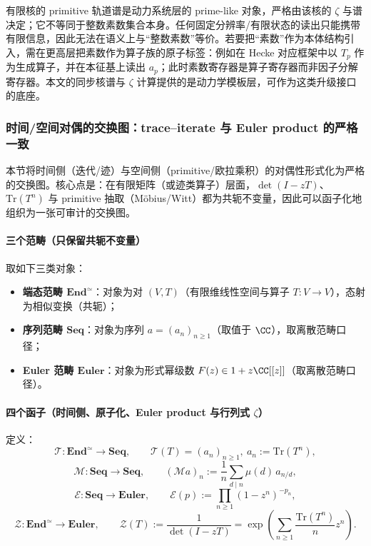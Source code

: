 \begin{remark}[素数影子与算术素数的层级差异]\label{rem:prime-shadow-vs-primes}
有限核的 primitive 轨道谱是动力系统层的 prime-like 对象，严格由该核的 $\zeta$ 与谱决定；它不等同于整数素数集合本身。任何固定分辨率/有限状态的读出只能携带有限信息，因此无法在语义上与“整数素数”等价。若要把“素数”作为本体结构引入，需在更高层把素数作为算子族的原子标签：例如在 Hecke 对应框架中以 $T_p$ 作为生成算子，并在本征基上读出 $a_p$；此时素数寄存器是算子寄存器而非因子分解寄存器。本文的同步核谱与 $\zeta$ 计算提供的是动力学模板层，可作为这类升级接口的底座。
\end{remark}

\subsubsection{时间/空间对偶的交换图：trace--iterate 与 Euler product 的严格一致}\label{subsec:time-space-commuting-diagram}
本节将时间侧（迭代/迹）与空间侧（primitive/欧拉乘积）的对偶性形式化为严格的交换图。核心点是：在有限矩阵（或迹类算子）层面，$\det(I-zT)$、$\mathrm{Tr}(T^n)$ 与 primitive 抽取（Möbius/Witt）都为共轭不变量，因此可以函子化地组织为一张可审计的交换图。

\paragraph{三个范畴（只保留共轭不变量）}
取如下三类对象：
\begin{itemize}
  \item \textbf{端态范畴 $\mathbf{End}^{\simeq}$}：对象为对 $(V,T)$（有限维线性空间与算子 $T:V\to V$），态射为相似变换（共轭）；
  \item \textbf{序列范畴 $\mathbf{Seq}$}：对象为序列 $a=(a_n)_{n\ge 1}$（取值于 $\CC$），取离散范畴口径；
  \item \textbf{Euler 范畴 $\mathbf{Euler}$}：对象为形式幂级数 $F(z)\in 1+z\CC[[z]]$（取离散范畴口径）。
\end{itemize}

\paragraph{四个函子（时间侧、原子化、Euler product 与行列式 $\zeta$）}
定义：
\[
\mathcal{T}:\mathbf{End}^{\simeq}\to\mathbf{Seq},\qquad
\mathcal{T}(T)=(a_n)_{n\ge 1},\ a_n:=\mathrm{Tr}(T^n),
\]
\[
\mathcal{M}:\mathbf{Seq}\to\mathbf{Seq},\qquad
(\mathcal{M}a)_n:=\frac{1}{n}\sum_{d\mid n}\mu(d)\,a_{n/d},
\]
\[
\mathcal{E}:\mathbf{Seq}\to\mathbf{Euler},\qquad
\mathcal{E}(p):=\prod_{n\ge 1}(1-z^n)^{-p_n},
\]
\[
\mathcal{Z}:\mathbf{End}^{\simeq}\to\mathbf{Euler},\qquad
\mathcal{Z}(T):=\frac{1}{\det(I-zT)}=\exp\!\left(\sum_{n\ge 1}\frac{\mathrm{Tr}(T^n)}{n}z^n\right).
\]


